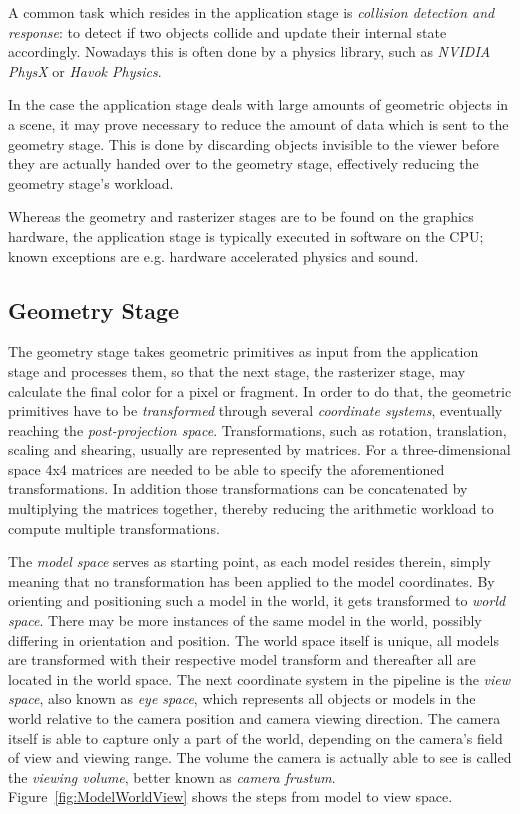 A common task which resides in the application stage is \textit{collision
detection and response}: to detect if two objects collide and update their
internal state accordingly. Nowadays this is often done by a physics library,
such as \textit{NVIDIA PhysX}\cite{misc:ageia-physx} or \textit{Havok
Physics}\cite{misc:havok}.

In the case the application stage deals with large amounts of geometric
objects in a scene, it may prove necessary to reduce the amount of data which
is sent to the geometry stage. This is done by discarding objects invisible to
the viewer before they are actually handed over to the geometry stage,
effectively reducing the geometry stage's workload.

Whereas the geometry and rasterizer stages are to be found on the graphics
hardware, the application stage is typically executed in software on the CPU;
known exceptions are e.g. hardware accelerated physics and sound.

\subsection{Geometry Stage}
The geometry stage takes geometric primitives as input from the application
stage and processes them, so that the next stage, the rasterizer stage, may
calculate the final color for a pixel or fragment. In order to do that, the
geometric primitives have to be \textit{transformed} through several
\textit{coordinate systems}, eventually reaching the \textit{post-projection
space}. Transformations, such as rotation, translation, scaling and shearing,
usually are represented by matrices. For a three-dimensional space 4x4 matrices
are needed to be able to specify the aforementioned transformations. In
addition those transformations can be concatenated by multiplying the matrices
together, thereby reducing the arithmetic workload to compute multiple
transformations.

The \textit{model space} serves as starting point, as each model resides
therein, simply meaning that no transformation has been applied to the model
coordinates. By orienting and positioning such a model in the world, it gets
transformed to \textit{world space}. There may be more instances of the same
model in the world, possibly differing in orientation and position. The world
space itself is unique, all models are transformed with their respective model
transform and thereafter all are located in the world space. The next
coordinate system in the pipeline is the \textit{view space}, also known as
\textit{eye space}, which represents all objects or models in the world relative
to the camera position and camera viewing direction. The camera itself is able
to capture only a part of the world, depending on the camera's field of view
and viewing range. The volume the camera is actually able to see is called the
\textit{viewing volume}, better known as \textit{camera frustum}.
Figure~\ref{fig:ModelWorldView} shows the steps from model to view space.

